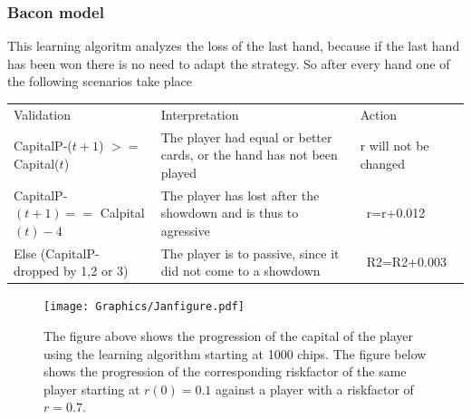 \documentclass[11pt]{article}
\begin{document}
\subsubsection{Bacon model}
This learning algoritm analyzes the loss of the last hand, because if the last hand has been won there is no need to adapt the strategy. So after every hand one of the following scenarios take place\\
\renewcommand{\arraystretch}{1.4}
\begin{tabular}{ p{6.45cm}   p{5.1cm}  p{2.4cm}}
Validation & Interpretation & Action\\
\addlinespace
CapitalP-($t+1$) $>=$ Capital($t$) &	The player had equal or better cards, or the hand has not been played&
r will not be changed \\
\addlinespace
CapitalP-$(t+1) ==$ Calpital$(t)-4$	&	The player has lost after the showdown and is thus to agressive & \ r=r+0.012\\
\addlinespace
Else (CapitalP- dropped by 1,2 or 3) &	The player is to passive, since it did not come to a showdown & \ R2=R2+0.003\\


\end{tabular}

\begin{figure}[h!]
\centering
\texttt{[image: Graphics/Janfigure.pdf]}
\caption{The figure above shows the progression of the capital of the player using the learning algorithm starting at 1000 chips. The figure below shows the progression of the corresponding riskfactor of the same player starting at $r(0)=0.1$ against a player with a riskfactor of $r=0.7$.\label{Abbildung}}
\end{figure}
\end{document}
